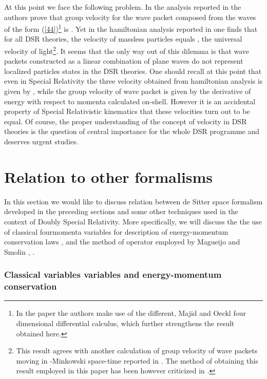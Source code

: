 \documentclass  [12pt] {article}
\providecommand{\dd}[2]{\frac{\partial #1}{\partial #2}}
\begin{document}
At this point we face the following problem. In the analysis
reported in \cite{Amelino-Camelia:2002tc} the authors prove that
group velocity for the wave packet composed from the waves of the
form (\ref{44})\footnote{In the paper
\cite{Amelino-Camelia:2002tc} the authors make use of the
different, Majid and Oeckl four dimensional differential calculus,
which further strengthens the result obtained here.} is \myHighlight{$v_g =
\dd{p_0}{|\vec{p}}$}\coordHE{}. Yet in the hamiltonian analysis reported in
\cite{JKM} one finds that for all DSR theories, the velocity of
massless particles equals \coordHE{}, the universal velocity of
light\footnote{This result agrees with another calculation of
group velocity of wave packets moving in \myHighlight{$\kappa$}\coordHE{}-Minkowski
space-time reported in \cite{Tamaki}. The method of obtaining this
result employed in this paper has  been however criticized in
\cite{Amelino-Camelia:2002tc}.}. It seems that the only way out of
this dilemma is that wave packets constructed as a linear
combination of plane waves do not represent localized particles
states in the DSR theories. One should recall at this point that
even in Special Relativity the three velocity obtained from
hamiltonian analysis is given by \coordHE{}, while the
group velocity of wave packet is given by the derivative of energy
with respect to momenta calculated on-shell. However it is an
accidental property of Special Relativistic kinematics that these
velocities turn out to be equal. Of course, the proper
understanding of the concept of velocity in DSR theories is the
question of central importance for the whole DSR programme and
deserves urgent studies.




\section{Relation to other formalisms}
In this section we would like to discuss relation between de Sitter space
formalism developed in the preceding sections and some other techniques used in
the context of Doubly Special Relativity. More specifically, we will discuss
the the use of classical fourmomenta variables for description of
energy-momentum conservation laws \cite{lunoDSR}, \cite{Judes:2002bw} and the
method of \coordHE{} operator employed by Magueijo and Smolin
\cite{Magueijo:2001cr}, \cite{Magueijo:2002am}.

\subsubsection*{Classical variables variables and energy-momentum conservation}
\end{document}

